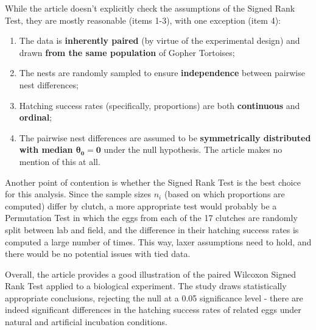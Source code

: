 \documentclass{article}
\begin{document}
\begin{multicols}{2}
While the article doesn't explicitly check the assumptions of the Signed Rank Test, they are mostly reasonable (items 1-3), with one exception (item 4):
\begin{enumerate}
    \itemsep-0.3em
    \item The data is \textbf{inherently paired} (by virtue of the experimental design) and drawn \textbf{from the same population} of Gopher Tortoises;
    \item The nests are randomly sampled to ensure \textbf{independence} between pairwise nest differences;
    \item Hatching success rates (specifically, proportions) are both \textbf{continuous} and \textbf{ordinal};
    \item The pairwise nest differences are assumed to be \textbf{symmetrically distributed with median $\boldsymbol{\theta_0 = 0}$} under the null hypothesis. The article makes no mention of this at all.
\end{enumerate}

Another point of contention is whether the Signed Rank Test is the best choice for this analysis. Since the sample sizes $n_i$ (based on which proportions are computed) differ by clutch, a more appropriate test would probably be a Permutation Test in which the eggs from each of the 17 clutches are randomly split between lab and field, and the difference in their hatching success rates is computed a large number of times. This way, laxer assumptions need to hold, and there would be no potential issues with tied data.

Overall, the article provides a good illustration of the paired Wilcoxon Signed Rank Test applied to a biological experiment. The study draws statistically appropriate conclusions, rejecting the null at a 0.05 significance level - there are indeed significant differences in the hatching success rates of related eggs under natural and artificial incubation conditions. 

\end{multicols}


\end{document}
